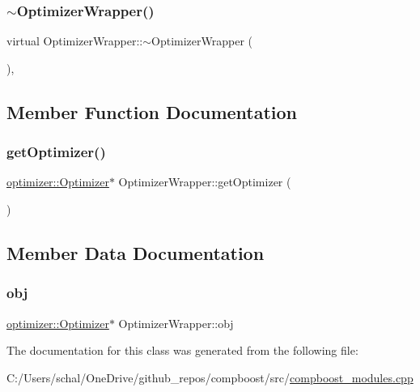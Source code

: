 \subsubsection{\texorpdfstring{$\sim$\+Optimizer\+Wrapper()}{~OptimizerWrapper()}}
{\footnotesize\ttfamily virtual Optimizer\+Wrapper\+::$\sim$\+Optimizer\+Wrapper (\begin{DoxyParamCaption}{ }\end{DoxyParamCaption})\hspace{0.3cm}{\ttfamily [inline]}, {\ttfamily [virtual]}}



\subsection{Member Function Documentation}
\mbox{\label{class_optimizer_wrapper_a422b3c46712a92935aca94a3479608da}} 
\subsubsection{\texorpdfstring{get\+Optimizer()}{getOptimizer()}}
{\footnotesize\ttfamily \mbox{\hyperlink{classoptimizer_1_1_optimizer}{optimizer\+::\+Optimizer}}$\ast$ Optimizer\+Wrapper\+::get\+Optimizer (\begin{DoxyParamCaption}{ }\end{DoxyParamCaption})\hspace{0.3cm}{\ttfamily [inline]}}



\subsection{Member Data Documentation}
\mbox{\label{class_optimizer_wrapper_ad13a4b9b51410c03d62fb668b5c91d70}} 
\subsubsection{\texorpdfstring{obj}{obj}}
{\footnotesize\ttfamily \mbox{\hyperlink{classoptimizer_1_1_optimizer}{optimizer\+::\+Optimizer}}$\ast$ Optimizer\+Wrapper\+::obj\hspace{0.3cm}{\ttfamily [protected]}}



The documentation for this class was generated from the following file\+:\begin{DoxyCompactItemize}
\item 
C\+:/\+Users/schal/\+One\+Drive/github\+\_\+repos/compboost/src/\mbox{\hyperlink{compboost__modules_8cpp}{compboost\+\_\+modules.\+cpp}}\end{DoxyCompactItemize}
